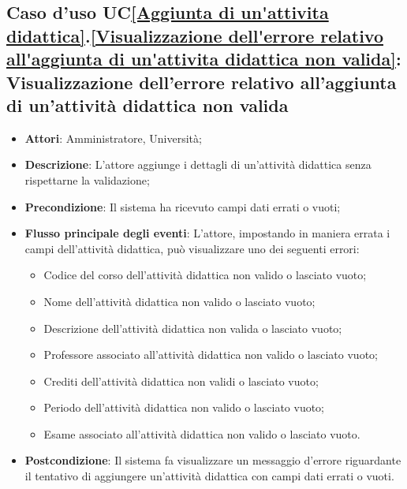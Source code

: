 \subsection{Caso d'uso UC\ref{Aggiunta di un'attivita didattica}.\ref{Visualizzazione dell'errore relativo all'aggiunta di un'attivita didattica non valida}: Visualizzazione dell'errore relativo all'aggiunta di un'attività didattica non valida}
\begin{itemize}
	\item \textbf{Attori}: Amministratore, Università;
	\item \textbf{Descrizione}: L'attore aggiunge i dettagli di un'attività didattica senza rispettarne la validazione;
	
	\item \textbf{Precondizione}: Il sistema ha ricevuto campi dati errati o vuoti;
	
	\item \textbf{Flusso principale degli eventi}: L'attore, impostando in maniera errata i campi dell'attività didattica, può visualizzare uno dei seguenti errori:
	\begin{itemize}
		\item Codice del corso dell'attività didattica non valido o lasciato vuoto;
		\item Nome dell'attività didattica non valido o lasciato vuoto;
		\item Descrizione dell'attività didattica non valida o lasciato vuoto;
		\item Professore associato all'attività didattica non valido o lasciato vuoto;
		\item Crediti dell'attività didattica non validi o lasciato vuoto;
		\item Periodo dell'attività didattica non valido o lasciato vuoto;
		\item Esame associato all'attività didattica non valido o lasciato vuoto.
	\end{itemize}
	\item \textbf{Postcondizione}: Il sistema fa visualizzare un messaggio d'errore riguardante il tentativo di aggiungere un'attività didattica con campi dati errati o vuoti.
	
\end{itemize}






